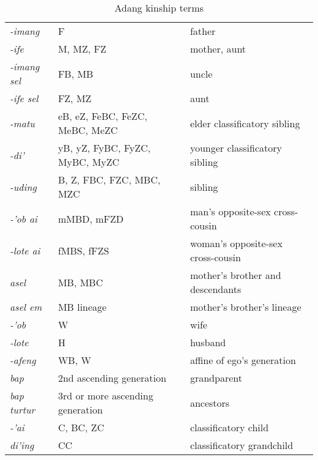 \begin{table}\centering


\begin{tabular}{p{3cm}p{3cm}p{5cm}}
\textit{{}-imang} & F & father\\
\textit{{}-ife} & M, MZ, FZ & mother, aunt\\
\textit{{}-imang sel} & FB, MB & uncle\\
\textit{{}-ife sel} & FZ, MZ & aunt\\
\textit{{}-matu} & eB, eZ, FeBC, FeZC, MeBC, MeZC & elder classificatory sibling\\
\textit{{}-di'} & yB, yZ, FyBC, FyZC, MyBC, MyZC & younger classificatory sibling\\
\textit{{}-uding} & B, Z, FBC, FZC, MBC, MZC & sibling\\
\textit{{}-'ob ai} & mMBD, mFZD & man's opposite-sex cross-cousin\\
\textit{{}-lote ai} & fMBS, fFZS & woman's opposite-sex cross-cousin\\
\textit{asel} & MB, MBC & mother's brother and descendants\\
\textit{asel em} & MB lineage & mother's brother's lineage\\
\textit{{}-'ob} & W & wife\\
\textit{{}-lote} & H & husband\\
\textit{{}-afeng} & WB, W & affine of ego's generation\\
\textit{bap} & 2nd ascending generation & grandparent\\
\textit{bap turtur} & 3rd or more ascending generation & ancestors\\
\textit{{}-'ai} & C, BC, ZC & classificatory child\\
\textit{di'ing} & CC & classificatory grandchild\\
\end{tabular}

\caption{Adang kinship terms}
\end{table}


